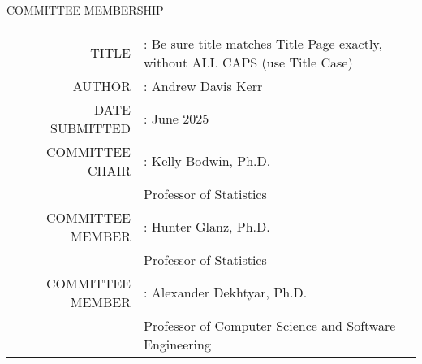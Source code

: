 \begin{center}
\thispagestyle{empty}
COMMITTEE MEMBERSHIP

\vspace{.5in}

\begin{tabular}{r@{}l}
TITLE & : \hspace*{1.5em}Be sure title matches Title Page exactly, without ALL CAPS (use Title Case) \\[.5in]
AUTHOR & : \hspace*{1.5em}Andrew Davis Kerr \\[.5in]
DATE SUBMITTED & : \hspace*{1.5em}June 2025 \\[2in]
COMMITTEE CHAIR & : \hspace*{1.5em}Kelly Bodwin, Ph.D. \\
 & \hspace*{2.2em}Professor of Statistics \\[.5in]
COMMITTEE MEMBER & : \hspace*{1.5em}Hunter Glanz, Ph.D. \\
 & \hspace*{2.2em}Professor of Statistics \\[.5in]
COMMITTEE MEMBER & : \hspace*{1.5em}Alexander Dekhtyar, Ph.D. \\
 & \hspace*{2.2em}Professor of Computer Science and Software Engineering \\
\end{tabular}
\end{center}
\clearpage